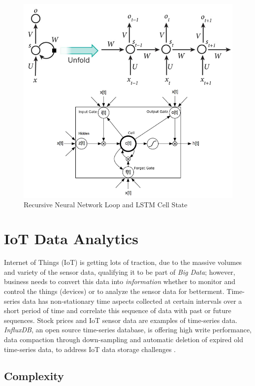 \documentclass[sigconf]{acmart}
\begin{document}
	\begin{figure}
		\centering
		\includegraphics[width=1.0\columnwidth]{images/rnn}
		\caption{Recursive Neural Network Loop and LSTM Cell State \cite{LeCun2015, Leonard2016}} \label{fig:figure4} 
	\end{figure}

	
	\section{IoT Data Analytics}
	
	Internet of Things (IoT) is getting lots of traction, due to the massive volumes and variety of the sensor data, qualifying it to be part of {\em Big Data}; however, business needs to convert this data into {\em information} whether to monitor and control the things (devices) or to analyze the sensor data for betterment. Time-series data has non-stationary time aspects collected at certain intervals over a short period of time and correlate this sequence of data with past or future sequences. Stock prices and IoT sensor data are examples of time-series data. {\em InfluxDB}, an open source time-series database, is offering high write performance, data compaction through down-sampling and automatic deletion of expired old time-series data, to address IoT data storage challenges \cite{Influx}.	
	
	
	\subsection{Complexity}
	
\end{document}
